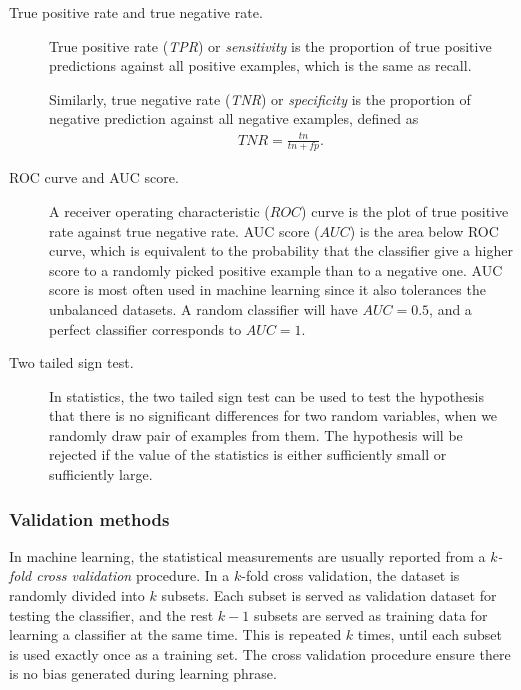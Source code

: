 \documentclass[english]{tktltiki}
\begin{document}
\begin{description}
\item[True positive rate and true negative rate.] True positive rate ({\em TPR}) or {\em sensitivity} is the proportion of true positive predictions against all positive examples, which is the same as recall.

Similarly, true negative rate ({\em TNR}) or {\em specificity} is the proportion of negative prediction against all negative examples, defined as
\begin{align*}
TNR = \frac{tn}{tn + fp}.
\end{align*}

\item[ROC curve and AUC score.] A receiver operating characteristic ($ROC$) curve is the plot of true positive rate against true negative rate. AUC score ($AUC$) is the area below ROC curve, which is equivalent to the probability that the classifier give a higher score to a randomly picked positive example than to a negative one. AUC score is most often used in machine learning since it also tolerances the unbalanced datasets. A random classifier will have $AUC = 0.5$, and a perfect classifier corresponds to $AUC = 1$.

\item[Two tailed sign test.] In statistics, the two tailed sign test can be used to test the hypothesis that there is no significant differences for two random variables, when we randomly draw pair of examples from them. The hypothesis will be rejected if the value of the statistics is either sufficiently small or sufficiently large. 

\end{description}



\subsubsection{Validation methods}

In machine learning, the statistical measurements are usually reported from a {\em $k$-fold cross validation} procedure. In a $k$-fold cross validation, the dataset is randomly divided into $k$ subsets. Each subset is served as validation dataset for testing the classifier, and the rest $k-1$ subsets are served as training data for learning a classifier at the same time. This is repeated $k$ times, until each subset is used exactly once as a training set. The cross validation procedure ensure there is no bias generated during learning phrase. 
\end{document}
